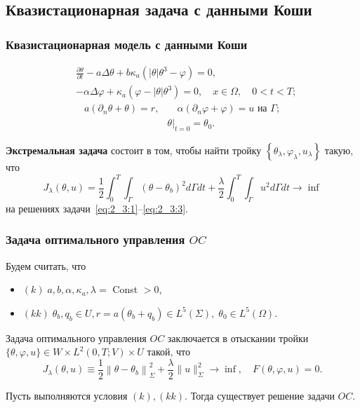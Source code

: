 \subsection{Квазистационарная задача с данными Коши}\label{subsec:qst_koshi}
\begin{frame}
    \frametitle{Квазистационарная модель с данными Коши}
    \begin{equation}
        \label{eq:2_3:1}
        \begin{split}
            & \frac{\partial \theta}{\partial t} - a \Delta \theta
            + b \kappa_{a} \left(|\theta| \theta^{3}-\varphi\right) = 0,\\
            & - \alpha \Delta \varphi
            + \kappa_{a} \left(\varphi-|\theta| \theta^{3}\right) = 0,
            \quad x \in \Omega, \quad 0 < t < T;
        \end{split}
    \end{equation}
    \begin{align}
        a \left(\partial_{n} \theta+\theta\right)=r,
        & \quad \alpha\left(\partial_{n} \varphi
        + \varphi\right) = u \text { на } \Gamma;  \label{eq:2_3:2}\\
        & \left.\theta\right|_{t=0} = \theta_{0}. \label{eq:2_3:3}
    \end{align}


    \textbf{Экстремальная задача} состоит в том, чтобы найти тройку
    $\left\{\theta_{\lambda}, \varphi_{\lambda}, u_{\lambda}\right\}$ такую, что
    \begin{equation}
        \label{eq:2_3:4}
        J_{\lambda}(\theta, u)=\frac{1}{2} \int_{0}^{T}
        \int_{\Gamma}\left(\theta-\theta_{b}\right)^{2} d \Gamma d t+\frac{\lambda}{2}
        \int_{0}^{T} \int_{\Gamma} u^{2} d \Gamma d t \rightarrow \inf
    \end{equation}
    на решениях задачи~\eqref{eq:2_3:1}--\eqref{eq:2_3:3}.
\end{frame}

\begin{frame}
    \frametitle{Задача оптимального управления $OC$}
    Будем считать, что
    \begin{itemize}
        \item $(k)\; a, b, \alpha, \kappa_{a}, \lambda=$ Const $>0$,
        \item $(kk)\; \theta_{b}, q_{b} \in U, r=a\left(\theta_{b}+q_{b}\right)
        \in L^{5}(\Sigma), \; \theta_{0} \in L^{5}(\Omega)$.
    \end{itemize}

    Задача оптимального управления $OC$ заключается в отыскании тройки
    $\{\theta, \varphi, u\} \in W \times L^{2}(0, T ; V) \times U$ такой, что
    \[
        J_{\lambda}(\theta, u) \equiv \frac{1}{2}\left\|\theta-
        \theta_{b}\right\|_{\Sigma}^{2}+
        \frac{\lambda}{2}\|u\|_{\Sigma}^{2}
        \rightarrow \inf, \quad F(\theta, \varphi, u)=0.
    \]
    \begin{theorem}
        \label{th:2_3:1}
        Пусть выполняются условия $(k), (kk)$.
        Тогда существует решение задачи $OC$.
    \end{theorem}

\end{frame}

